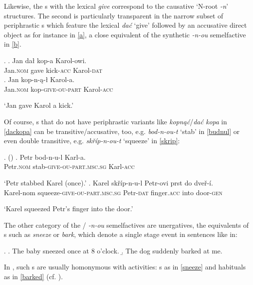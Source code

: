 \noindent
Likewise, the  s with the lexical \textit{give} correspond to the causative `N-root \textit{-n}' structures. The second is particularly transparent in the narrow subset of  periphrastic s which feature the lexical  \textit{da\'c} `give' followed by an accusative direct object as for instance in \ref{a}, a close equivalent of the synthetic \textit{-n-ou} semelfactive in \ref{b}.


\ex. \label{dackopa}
\ag. Jan da\l {} kop-a Karol-owi.\label{a}\\
Jan.\textsc{nom} gave  kick-\textsc{acc} Karol-\textsc{dat}\\
\bg. Jan kop-n-\k{a}-\l {} Karol-a.\label{b}\\
Jan.\textsc{nom} kop-\textsc{give-ou-part} Karol-\textsc{acc}\\
\strut `Jan gave Karol a kick.'\label{Karol}

Of course, s that do not have periphrastic variants like \textit{kopn\k{a}\'c}/\textit{da\'c kopa} in \ref{dackopa} can be transitive/accusative, too, e.g. \textit{bod-n-ou-t} `stab' in \ref{budnul} or even  double transitive, e.g. \textit{sk\v{r}\'ip-n-ou-t} `squeeze' in \ref{skrip}:

\ex.  (\citealt[ex. 82]{NU})
\ag.
Petr bod-n-u-l Karl-a. \\
Petr\textsc{.nom} stab-\textsc{give}-\textsc{ou}-\textsc{part.msc.sg} Karl-\textsc{acc}\\
\strut `Petr stabbed Karel (once).'\label{budnul}
\bg. 
Karel sk\v r\'ip-n-u-l Petr-ovi prst do dve\v{r}-\'i. \\
Karel-{\sc nom} squeeze-\textsc{give}-\textsc{ou}-\textsc{part.msc.sg} Petr-\textsc{dat} finger.\textsc{acc} into door-\textsc{gen} \\ 
\strut `Karel squeezed Petr's finger into the door.'\label{skrip}
 
\noindent The other category of the / \textit{-n-ou} semelfactives are unergatives, the equivalents of  s such as \textit{sneeze} or \textit{bark}, which denote a single stage event in sentences like in:

\ex. 
\a. The baby sneezed once at 8 o'clock.  
\b. The dog suddenly barked at me.

In , such s are usually homonymous with activities: s as in \ref{sneeze} and habituals as in \ref{barked} (cf. \citealt{Carlson2012}).

